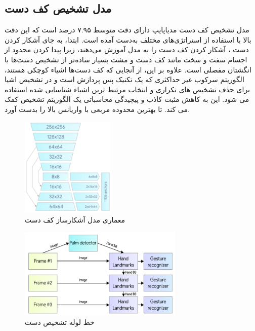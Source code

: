 \subsection{مدل تشخیص کف دست}
مدل تشخیص کف دست مدیاپایپ دارای دقت متوسط ۷.۹۵ درصد است که این دقت بالا با استفاده از استراتژی‌های مختلف به‌دست آمده است. ابتدا، به جای آشکار کردن دست
، آشکار کردن کف دست را به مدل آموزش می‌دهند، زیرا پیدا کردن محدود از اجسام سفت و سخت مانند کف دست و مشت بسیار ساده‌تر از تشخیص دست‌ها با 
انگشتان مفصلی است. علاوه بر این، از آنجایی که کف دست‌ها اشیاء کوچکی هستند، الگوریتم سرکوب غیر حداکثری 
که یک تکنیک پس پردازش  است و در تشخیص اشیا برای حذف تشخیص های تکراری 
و انتخاب مرتبط ترین اشیاء شناسایی شده استفاده می شود. این به کاهش مثبت کاذب  و پیچیدگی محاسباتی 
یک الگوریتم تشخیص کمک می کند. تا بهترین محدوده مربعی  با واریانس بالا  را بدست آورد. \cite{zhang2020mediapipe}


\begin{figure}[h]
    \centering
    \includegraphics[width=0.4\textwidth]{hand_detector.png}
    \caption{معماری مدل آشکارساز کف دست}
\end{figure}

\begin{figure}[h]
    \centering
    \includegraphics[width=0.7\textwidth]{mediapipe.png}
    \caption{خط لوله تشخیص دست}
\end{figure}

